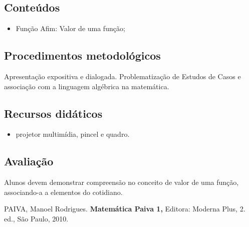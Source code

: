 \documentclass[oneside,a4paper,12pt]{article}
\begin{document}
  \begin{snugshade}
  \section{Conteúdos} %
  \end{snugshade}

    \begin{itemize}

      \item Função Afim: Valor de uma função;

    \end{itemize}

  \begin{snugshade}
  \section{Procedimentos metodológicos} %
  \end{snugshade}

	Apresentação expositiva e dialogada. Problematização de Estudos de Casos e associação com
    a linguagem algébrica na matemática.

  \begin{snugshade}
  \section{Recursos didáticos} %
  \end{snugshade}

    \begin{itemize}

	  \item projetor multimídia, pincel e quadro.

    \end{itemize}

  \begin{snugshade}
  \section{Avaliação} %
  \end{snugshade}

  Alunos devem demonstrar compreensão no conceito de valor de uma função, associando-a a elementos do cotidiano.




\begin{thebibliography}{}

PAIVA, Manoel Rodrigues.
\newblock \textbf{Matemática Paiva 1,}
\newblock Editora: Moderna Plus, 2. ed., São Paulo, 2010.

\end{thebibliography}
\end{document}
